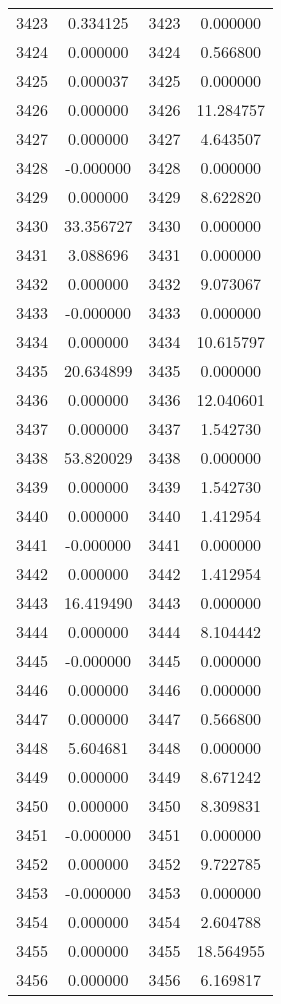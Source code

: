 \documentclass[12pt]{article}
\begin{document}
\begin{longtable}{@{}cccc@{}}
3423 & 0.334125 & 3423 & 0.000000 \\
3424 & 0.000000 & 3424 & 0.566800 \\
3425 & 0.000037 & 3425 & 0.000000 \\
3426 & 0.000000 & 3426 & 11.284757 \\
3427 & 0.000000 & 3427 & 4.643507 \\
3428 & -0.000000 & 3428 & 0.000000 \\
3429 & 0.000000 & 3429 & 8.622820 \\
3430 & 33.356727 & 3430 & 0.000000 \\
3431 & 3.088696 & 3431 & 0.000000 \\
3432 & 0.000000 & 3432 & 9.073067 \\
3433 & -0.000000 & 3433 & 0.000000 \\
3434 & 0.000000 & 3434 & 10.615797 \\
3435 & 20.634899 & 3435 & 0.000000 \\
3436 & 0.000000 & 3436 & 12.040601 \\
3437 & 0.000000 & 3437 & 1.542730 \\
3438 & 53.820029 & 3438 & 0.000000 \\
3439 & 0.000000 & 3439 & 1.542730 \\
3440 & 0.000000 & 3440 & 1.412954 \\
3441 & -0.000000 & 3441 & 0.000000 \\
3442 & 0.000000 & 3442 & 1.412954 \\
3443 & 16.419490 & 3443 & 0.000000 \\
3444 & 0.000000 & 3444 & 8.104442 \\
3445 & -0.000000 & 3445 & 0.000000 \\
3446 & 0.000000 & 3446 & 0.000000 \\
3447 & 0.000000 & 3447 & 0.566800 \\
3448 & 5.604681 & 3448 & 0.000000 \\
3449 & 0.000000 & 3449 & 8.671242 \\
3450 & 0.000000 & 3450 & 8.309831 \\
3451 & -0.000000 & 3451 & 0.000000 \\
3452 & 0.000000 & 3452 & 9.722785 \\
3453 & -0.000000 & 3453 & 0.000000 \\
3454 & 0.000000 & 3454 & 2.604788 \\
3455 & 0.000000 & 3455 & 18.564955 \\
3456 & 0.000000 & 3456 & 6.169817 \\

\end{longtable}
\end{document}
